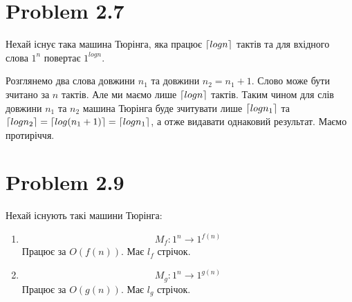 \documentclass[12pt,letterpaper]{article}
\DeclarePairedDelimiter{\ceil}{\lceil}{\rceil}
\begin{document}
\section{Problem 2.7}

Нехай існує така машина Тюрінга, яка працює $\ceil{log n}$ тактів та для вхідного 
слова $1^n$ повертає $1^{log n}$.

Розглянемо два слова довжини $n_1$ та довжини $n_2 = n_1 + 1$.
Слово може бути зчитано за $n$ тактів. Але ми маємо лише $\ceil{log n}$ тактів.
Таким чином для слів довжини $n_1$ та $n_2$ машина Тюрінга буде зчитувати лише
$\ceil{log n_1}$ та $\ceil{log n_2} = \ceil{log (n_1 + 1)} = \ceil{log n_1}$, а отже
видавати однаковий результат. Маємо протиріччя.

\section{Problem 2.9}

Нехай існують такі машини Тюрінга:
\begin{enumerate}
    \item \[ M_{f}: 1^{n} \rightarrow 1^{f(n)} \]
        Працює за $O(f(n))$. Має $l_f$ стрічок.

    \item \[ M_{g}: 1^n \rightarrow 1^{g(n)} \]
        Працює за $O(g(n))$. Має $l_g$ стрічок.
\end{enumerate}
\end{document}
